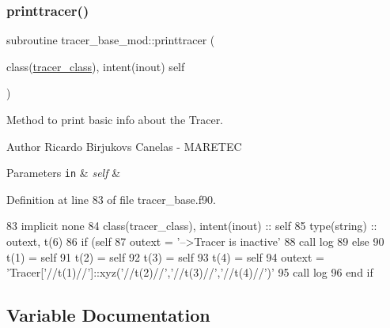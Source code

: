 \subsubsection{\texorpdfstring{printtracer()}{printtracer()}}
{\footnotesize\ttfamily subroutine tracer\+\_\+base\+\_\+mod\+::printtracer (\begin{DoxyParamCaption}\item[{class(\mbox{\hyperlink{structtracer__base__mod_1_1tracer__class}{tracer\+\_\+class}}), intent(inout)}]{self }\end{DoxyParamCaption})\hspace{0.3cm}{\ttfamily [private]}}



Method to print basic info about the Tracer. 

\begin{DoxyAuthor}{Author}
Ricardo Birjukovs Canelas -\/ M\+A\+R\+E\+T\+EC 
\end{DoxyAuthor}

\begin{DoxyParams}[1]{Parameters}
\mbox{\tt in}  & {\em self} & \\
\hline
\end{DoxyParams}


Definition at line 83 of file tracer\+\_\+base.\+f90.


\begin{DoxyCode}
83     \textcolor{keywordtype}{implicit none}
84     \textcolor{keywordtype}{class}(tracer\_class), \textcolor{keywordtype}{intent(inout)} :: self
85     \textcolor{keywordtype}{type}(string) :: outext, t(6)
86     \textcolor{keywordflow}{if} (self%
87         outext = \textcolor{stringliteral}{'-->Tracer is inactive'}
88         \textcolor{keyword}{call }log%
89     \textcolor{keywordflow}{else}
90         t(1) = self%
91         t(2) = self%
92         t(3) = self%
93         t(4) = self%
94         outext = \textcolor{stringliteral}{'Tracer['}//t(1)//\textcolor{stringliteral}{']::xyz('}//t(2)//\textcolor{stringliteral}{','}//t(3)//\textcolor{stringliteral}{','}//t(4)//\textcolor{stringliteral}{')'}
95         \textcolor{keyword}{call }log%
96 \textcolor{keywordflow}{    end if}
\end{DoxyCode}


\subsection{Variable Documentation}
\mbox{\label{namespacetracer__base__mod_a6e04d44b4ef46cf27fb0e38290a98c14}} 
